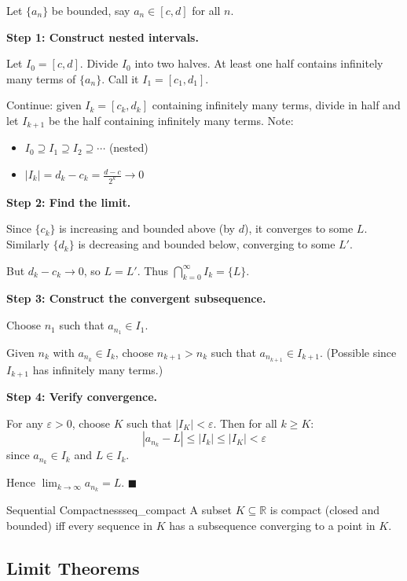 \documentclass[11pt, letterpaper, openany]{book}
\renewenvironment{proof}[1][\proofname]{%
  \tcolorbox[blanker, breakable, left=1em,
    before skip=1em, after skip=1em,
    borderline west={2pt}{0pt}{MagicTeal!50},
    colback=MagicCream,
    before upper={\textcolor{MagicTeal}{\sffamily\bfseries #1.}\space}
  ]%
}{%
  \hfill\textcolor{MagicTeal}{\ensuremath{\blacksquare}}\endtcolorbox%
}
\begin{document}
\begin{proof}
Let $\{a_n\}$ be bounded, say $a_n \in [c, d]$ for all $n$.

\textbf{Step 1: Construct nested intervals.}

Let $I_0 = [c, d]$. Divide $I_0$ into two halves. At least one half contains infinitely many terms of $\{a_n\}$. Call it $I_1 = [c_1, d_1]$.

Continue: given $I_k = [c_k, d_k]$ containing infinitely many terms, divide in half and let $I_{k+1}$ be the half containing infinitely many terms. Note:
\begin{itemize}
    \item $I_0 \supseteq I_1 \supseteq I_2 \supseteq \cdots$ (nested)
    \item $|I_k| = d_k - c_k = \frac{d - c}{2^k} \to 0$
\end{itemize}

\textbf{Step 2: Find the limit.}

Since $\{c_k\}$ is increasing and bounded above (by $d$), it converges to some $L$. Similarly $\{d_k\}$ is decreasing and bounded below, converging to some $L'$.

But $d_k - c_k \to 0$, so $L = L'$. Thus $\bigcap_{k=0}^\infty I_k = \{L\}$.

\textbf{Step 3: Construct the convergent subsequence.}

Choose $n_1$ such that $a_{n_1} \in I_1$.

Given $n_k$ with $a_{n_k} \in I_k$, choose $n_{k+1} > n_k$ such that $a_{n_{k+1}} \in I_{k+1}$. (Possible since $I_{k+1}$ has infinitely many terms.)

\textbf{Step 4: Verify convergence.}

For any $\varepsilon > 0$, choose $K$ such that $|I_K| < \varepsilon$. Then for all $k \geq K$:
\[|a_{n_k} - L| \leq |I_k| \leq |I_K| < \varepsilon\]
since $a_{n_k} \in I_k$ and $L \in I_k$.

Hence $\lim_{k \to \infty} a_{n_k} = L$.
\end{proof}

\begin{cor}{Sequential Compactness}{seq_compact}
A subset $K \subseteq \mathbb{R}$ is compact (closed and bounded) iff every sequence in $K$ has a subsequence converging to a point in $K$.
\end{cor}

\subsection{Limit Theorems}
\end{document}
